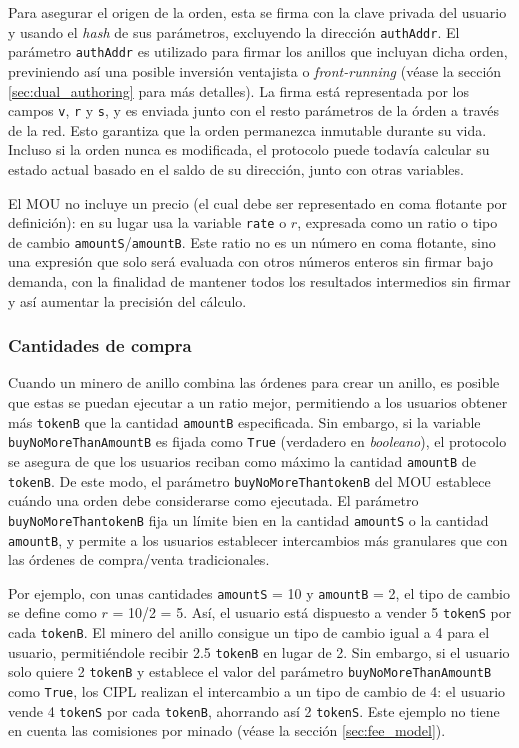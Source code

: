 \documentclass[UTF8,nofonts]{article}
\begin{document}
\begin{multicols}{2}
Para asegurar el origen de la orden, esta se firma con la clave privada del usuario y usando el \textit{hash} de sus parámetros, excluyendo  la dirección \verb|authAddr|. El parámetro \verb|authAddr| es utilizado para firmar los anillos que incluyan dicha orden, previniendo así una posible inversión ventajista o \textit{front-running} (véase la sección \ref{sec:dual_authoring} para más detalles). La firma está representada por los campos \verb|v|, \verb|r| y \verb|s|, y es enviada junto con el resto parámetros de la órden a través de la red. Esto garantiza que la orden permanezca inmutable durante su vida. Incluso si la orden nunca es modificada, el protocolo puede todavía calcular su estado actual basado en el saldo de su dirección, junto con otras variables.



El MOU no incluye un precio (el cual debe ser representado en coma flotante por definición): en su lugar usa la variable \verb|rate| o $r$, expresada como un ratio o tipo de cambio \verb|amountS|/\verb|amountB|. Este ratio no es un número en coma flotante, sino una expresión que solo será evaluada con otros números enteros sin firmar bajo demanda, con la finalidad de mantener todos los resultados intermedios sin firmar y así aumentar la precisión del cálculo. 

\subsubsection{Cantidades de compra}

Cuando un minero de anillo combina las órdenes para crear un anillo, es posible que estas se puedan ejecutar a un ratio mejor, permitiendo a los usuarios obtener más \verb|tokenB| que la cantidad \verb|amountB| especificada. Sin embargo, si la variable \verb|buyNoMoreThanAmountB| es fijada como \verb|True| (verdadero en \textit{booleano}), el protocolo se asegura de que los usuarios reciban como máximo la cantidad \verb|amountB| de \verb|tokenB|. De este modo, el parámetro \verb|buyNoMoreThantokenB| del MOU establece cuándo una orden debe considerarse como ejecutada. El parámetro \verb|buyNoMoreThantokenB| fija un límite bien en la cantidad \verb|amountS| o la cantidad \verb|amountB|, y permite a los usuarios establecer intercambios más granulares que con las órdenes de compra/venta tradicionales.

Por ejemplo, con unas cantidades \verb|amountS| = 10 y \verb|amountB| = 2, el tipo de cambio se define como $r$ = 10/2 = 5. Así, el usuario está dispuesto a vender 5 \verb|tokenS| por cada \verb|tokenB|. El minero del anillo consigue un tipo de cambio igual a 4 para el usuario, permitiéndole recibir 2.5 \verb|tokenB| en lugar de 2. Sin embargo, si el usuario solo quiere 2 \verb|tokenB| y establece el valor del parámetro \verb|buyNoMoreThanAmountB| como \verb|True|, los CIPL realizan el intercambio a un tipo de cambio de 4: el usuario vende 4 \verb|tokenS| por cada \verb|tokenB|, ahorrando así 2 \verb|tokenS|. Este ejemplo no tiene en cuenta las comisiones por minado (véase la sección \ref{sec:fee_model}).


\end{multicols}
\end{document}

